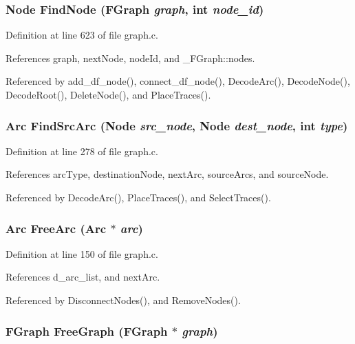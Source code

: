 \subsubsection{\setlength{\rightskip}{0pt plus 5cm}\bf{Node} Find\-Node (\bf{FGraph} {\em graph}, int {\em node\_\-id})}\label{graph_8h_21ec3ddb78f3282ba7454ea7a44426f0}




Definition at line 623 of file graph.c.

References graph, next\-Node, node\-Id, and \_\-FGraph::nodes.

Referenced by add\_\-df\_\-node(), connect\_\-df\_\-node(), Decode\-Arc(), Decode\-Node(), Decode\-Root(), Delete\-Node(), and Place\-Traces().
\subsubsection{\setlength{\rightskip}{0pt plus 5cm}\bf{Arc} Find\-Src\-Arc (\bf{Node} {\em src\_\-node}, \bf{Node} {\em dest\_\-node}, int {\em type})}\label{graph_8h_936ce714faf05a0e434203bfa785b5ec}




Definition at line 278 of file graph.c.

References arc\-Type, destination\-Node, next\-Arc, source\-Arcs, and source\-Node.

Referenced by Decode\-Arc(), Place\-Traces(), and Select\-Traces().
\subsubsection{\setlength{\rightskip}{0pt plus 5cm}\bf{Arc} Free\-Arc (\bf{Arc} $\ast$ {\em arc})}\label{graph_8h_3459b0aafa62f3a05b5fbdfd7cc6fdf4}




Definition at line 150 of file graph.c.

References d\_\-arc\_\-list, and next\-Arc.

Referenced by Disconnect\-Nodes(), and Remove\-Nodes().
\subsubsection{\setlength{\rightskip}{0pt plus 5cm}\bf{FGraph} Free\-Graph (\bf{FGraph} $\ast$ {\em graph})}\label{graph_8h_21f7025d01cd1f76fa141deb52814f74}




